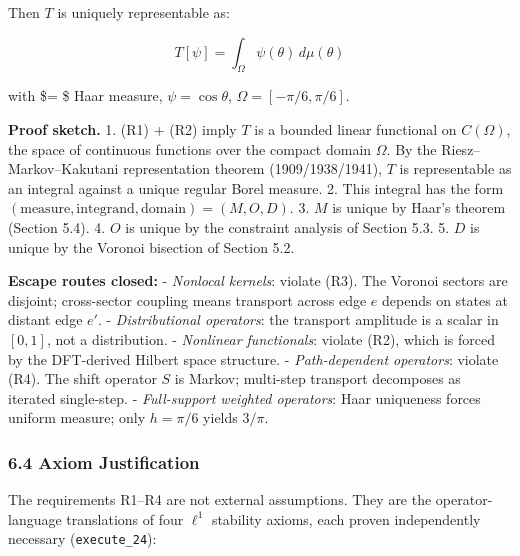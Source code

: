 \documentclass[
]{article}
\begin{document}
Then \(T\) is uniquely representable as:

\[T[\psi] = \int_\Omega \psi(\theta) \, d\mu(\theta)\]

with \$\mu = \$ Haar measure, \(\psi = \cos\theta\),
\(\Omega = [-\pi/6, \pi/6]\).

\textbf{Proof sketch.} 1. (R1) + (R2) imply \(T\) is a bounded linear
functional on \(C(\Omega)\), the space of continuous functions over the
compact domain \(\Omega\). By the Riesz--Markov--Kakutani representation
theorem (1909/1938/1941), \(T\) is representable as an integral against
a unique regular Borel measure. 2. This integral has the form
\((\text{measure}, \text{integrand}, \text{domain}) = (M, O, D)\). 3.
\(M\) is unique by Haar's theorem (Section 5.4). 4. \(O\) is unique by
the constraint analysis of Section 5.3. 5. \(D\) is unique by the
Voronoi bisection of Section 5.2.

\textbf{Escape routes closed:} - \emph{Nonlocal kernels}: violate (R3).
The Voronoi sectors are disjoint; cross-sector coupling means transport
across edge \(e\) depends on states at distant edge \(e'\). -
\emph{Distributional operators}: the transport amplitude is a scalar in
\([0, 1]\), not a distribution. - \emph{Nonlinear functionals}: violate
(R2), which is forced by the DFT-derived Hilbert space structure. -
\emph{Path-dependent operators}: violate (R4). The shift operator \(S\)
is Markov; multi-step transport decomposes as iterated single-step. -
\emph{Full-support weighted operators}: Haar uniqueness forces uniform
measure; only \(h = \pi/6\) yields \(3/\pi\).

\hypertarget{axiom-justification}{%
\subsubsection{6.4 Axiom Justification}\label{axiom-justification}}

The requirements R1--R4 are not external assumptions. They are the
operator-language translations of four \(\ell^1\) stability axioms, each
proven independently necessary (\texttt{execute\_24}):
\end{document}
